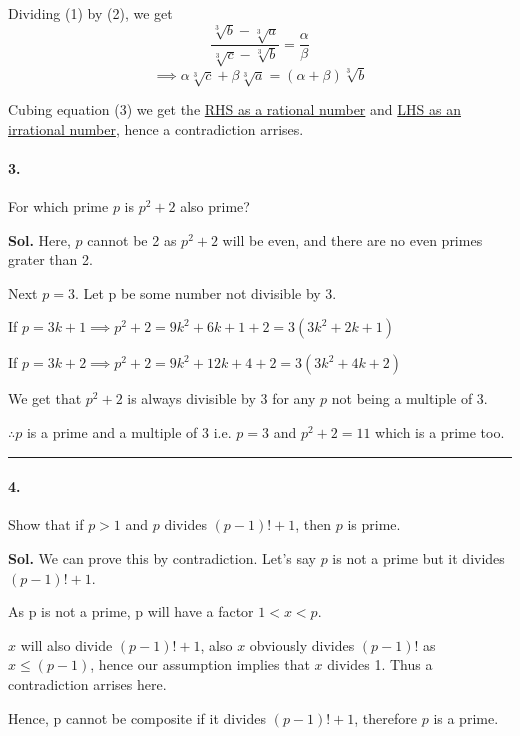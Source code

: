 \documentclass[12pt,oneside,reqno]{amsart}
\begin{document}
Dividing (1) by (2), we get
$$
    \frac{\sqrt[3]{b}-\sqrt[3]{a}}{\sqrt[3]{c}-\sqrt[3]{b}} = \frac{\alpha}{\beta}
$$
\begin{equation}
    \implies \alpha \sqrt[3]{c} + \beta \sqrt[3]{a} = (\alpha + \beta)\sqrt[3]{b}
\end{equation}

Cubing equation (3) we get the \underline{RHS as a rational number} and \underline{LHS as an irrational number}, hence a contradiction arrises.


\paragraph*{3.} For which prime $p$ is $p^2 + 2$ also prime?

\bigskip
\textbf{Sol.}
Here, $p$ cannot be 2 as $p^2 + 2$ will be even, and there are no even primes grater than 2.

Next $p=3$.
Let p be some number not divisible by 3.

If $p=3k+1 \implies p^2 + 2 = 9k^2+6k+1+2 = 3(3k^2 + 2k + 1)$ 

If $p=3k+2 \implies p^2 + 2 = 9k^2+12k+4+2 = 3(3k^2 + 4k + 2)$ 

We get that $p^2+2$ is always divisible by 3 for any $p$ not being a multiple of 3.

$\therefore p$ is a prime and a multiple of 3 i.e. $\boxed{p = 3}$ and $p^2 + 2 = 11$ which is a prime too. 


\par\noindent\textcolor{gray}{\rule{\textwidth}{0.5pt}}
\smallskip

\paragraph*{4.} Show that if $p > 1$ and $p$ divides $(p - 1)! + 1$, then $p$ is prime.

\bigskip
\textbf{Sol.}
We can prove this by contradiction. Let's say $p$ is not a prime but it divides $(p - 1)! + 1$.

As p is not a prime, p will have a factor $1 < x < p$.

$x$ will also divide $(p - 1)! + 1$, also $x$ obviously divides $(p-1)!$ as $x \le (p-1)$, hence our assumption implies that $x$ divides 1.
Thus a contradiction arrises here.

Hence, p cannot be composite if it divides $(p - 1)! + 1$, therefore $p$ is a prime.
\end{document}
